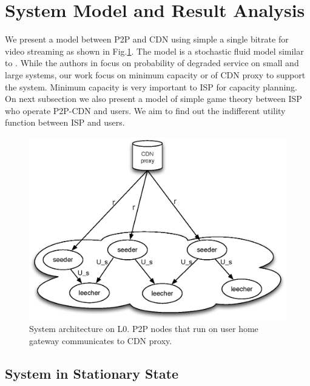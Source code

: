 \documentclass[paper]{ieice}
\begin{document}
  
 
\section{System Model and Result Analysis}\label{systemmodel}
We present a model between P2P and CDN using simple a single bitrate for video streaming as shown in Fig.\ref{fig:twotier2}. 
The model is a stochastic fluid model similar to \cite{4215694}.
While the authors in \cite{4215694} focus on probability of degraded service on small and large systems, our work focus on minimum capacity or of CDN proxy to support the system.
Minimum capacity is very important to ISP for capacity planning.
On next subsection we also present a model of simple game theory between ISP who operate P2P-CDN and users.
We aim to find out the indifferent utility function between ISP and users.

\begin{figure}[tb] 
\begin{center}
\includegraphics[scale=0.4]{graphs/two-tier-cdn-topology-2.eps}
\end{center}
\caption{System architecture on L0. P2P nodes that run on user home gateway communicates to CDN proxy.}
\label{fig:twotier2}
\vspace{-2mm}
\end{figure}

\subsection{System in Stationary State}
\end{document}
